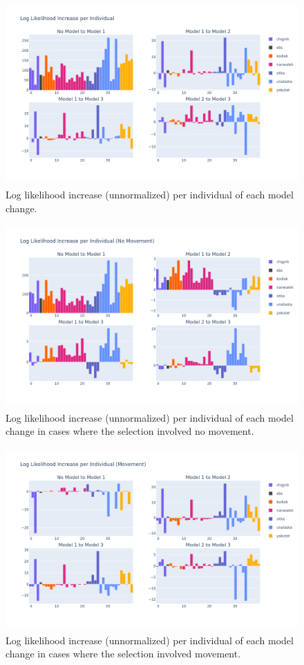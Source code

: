 \documentclass[11pt]{article}
\begin{document}
\begin{figure}[h!] 
	\centering
  \includegraphics[height=70mm]{figures/ll_increase.png}
  \caption{Log likelihood increase (unnormalized) per individual of each model change.}
  \label{fig:ll_increase}
\end{figure}

\begin{figure}[h!] 
	\centering
  \includegraphics[height=70mm]{figures/ll_increase_no_movement.png}
  \caption{Log likelihood increase (unnormalized) per individual of each model change in cases where the selection involved no movement.}
  \label{fig:ll_increase_no_movement}
\end{figure}

\FloatBarrier

\begin{figure}[h!] 
	\centering
  \includegraphics[height=70mm]{figures/ll_increase_movement.png}
  \caption{Log likelihood increase (unnormalized) per individual of each model change in cases where the selection involved movement.}
  \label{fig:ll_increase_movement}
\end{figure}
\end{document}
